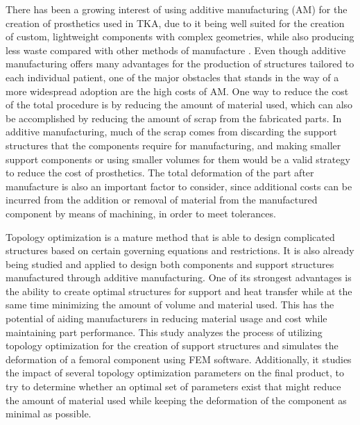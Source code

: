\documentclass[../main.tex]{subfiles}
\begin{document}
There has been a growing interest of using additive manufacturing (AM) for the creation of prosthetics used in TKA, due to it being well suited for the creation of custom, lightweight components with complex geometries, while also producing less waste compared with other methods of manufacture \cite{narraAdditiveManufacturingTotal2019}. Even though additive manufacturing offers many advantages for the production of structures tailored to each individual patient, one of the major obstacles that stands in the way of a more widespread adoption are the high costs of AM. One way to reduce the cost of the total procedure is by reducing the amount of material used, which can also be accomplished by reducing the amount of scrap from the fabricated parts.  In additive manufacturing, much of the scrap comes from discarding the support structures that the components require for manufacturing, and making smaller support components or using smaller volumes for them would be a valid strategy to reduce the cost of prosthetics. The total deformation of the part after manufacture is also an important factor to consider, since additional costs can be incurred from the addition or removal of material from the manufactured component by means of machining, in order to meet tolerances. 

Topology optimization is a mature method that is able to design complicated structures based on certain governing equations and restrictions. It is also already being studied and applied to design both components and support structures manufactured through additive manufacturing. One of its strongest advantages is the ability to create optimal structures for support and heat transfer while at the same time minimizing the amount of volume and material used. This has the potential of aiding manufacturers in reducing material usage and cost while maintaining part performance. This study analyzes the process of utilizing topology optimization for the creation of support structures and simulates the deformation of a femoral component using FEM software. Additionally, it studies the impact of several topology optimization parameters on the final product, to try to determine whether an optimal set of parameters exist that might reduce the amount of material used while keeping the deformation of the component as minimal as possible.
\end{document}
